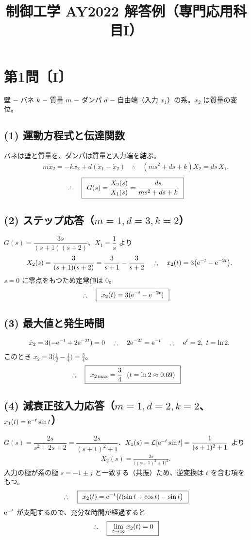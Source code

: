 \documentclass[11pt,a4paper]{article}
\title{制御工学 AY2022 解答例（専門応用科目I）}
\author{}
\date{}
\begin{document}
\maketitle

\section*{第1問〔I〕}

壁 $-$ バネ $k$ $-$ 質量 $m$ $-$ ダンパ $d$ $-$ 自由端（入力 $x_1$）の系。$x_2$ は質量の変位。

\subsection*{(1) 運動方程式と伝達関数}
バネは壁と質量を、ダンパは質量と入力端を結ぶ。
\begin{align*}
  &\qquad m\ddot{x}_2=-k x_2+d(\dot{x}_1-\dot{x}_2)
   \quad\therefore\quad (ms^2+ds+k)X_2=ds\,X_1.
\end{align*}
\[
  \therefore\quad \boxed{\,\;G(s)=\dfrac{X_2(s)}{X_1(s)}=\dfrac{ds}{ms^2+ds+k}\;\,}
\]

\subsection*{(2) ステップ応答（$m=1,d=3,k=2$）}
$G(s)=\dfrac{3s}{(s+1)(s+2)}$、$X_1=\dfrac1s$ より
\begin{align*}
  &\qquad X_2(s)=\frac{3}{(s+1)(s+2)}=\frac{3}{s+1}-\frac{3}{s+2}
   \quad\therefore\quad x_2(t)=3\bigl(\mathrm{e}^{-t}-\mathrm{e}^{-2t}\bigr).
\end{align*}
$s=0$ に零点をもつため定常値は $0$。
\[
  \therefore\quad \boxed{\,\;x_2(t)=3(\mathrm{e}^{-t}-\mathrm{e}^{-2t})\;\,}
\]

\subsection*{(3) 最大値と発生時間}
\begin{align*}
  &\qquad \dot{x}_2=3(-\mathrm{e}^{-t}+2\mathrm{e}^{-2t})=0
   \quad\therefore\quad 2\mathrm{e}^{-2t}=\mathrm{e}^{-t}
   \quad\therefore\quad \mathrm{e}^{t}=2,\ t=\ln 2.
\end{align*}
このとき $x_2=3\bigl(\tfrac12-\tfrac14\bigr)=\tfrac34$。
\[
  \therefore\quad \ans{\;x_{2\max}=\dfrac34\ \ (t=\ln2\approx0.69)\;}
\]

\subsection*{(4) 減衰正弦入力応答（$m=1,d=2,k=2$、$x_1(t)=\mathrm{e}^{-t}\sin t$）}
$G(s)=\dfrac{2s}{s^2+2s+2}=\dfrac{2s}{(s+1)^2+1}$、$X_1(s)=\mathcal{L}[\mathrm{e}^{-t}\sin t]=\dfrac{1}{(s+1)^2+1}$ より
\begin{align*}
  &\qquad X_2(s)=\frac{2s}{\bigl((s+1)^2+1\bigr)^2}.
\end{align*}
入力の極が系の極 $s=-1\pm j$ と一致する（共振）ため、逆変換は $t$ を含む項をもつ。
\[
  \therefore\quad \boxed{\,\;x_2(t)=\mathrm{e}^{-t}\bigl(t(\sin t+\cos t)-\sin t\bigr)\;\,}
\]
$\mathrm{e}^{-t}$ が支配するので、充分な時間が経過すると
\[
  \therefore\quad \boxed{\,\;\lim_{t\to\infty}x_2(t)=0\;\,}
\]
\end{document}
